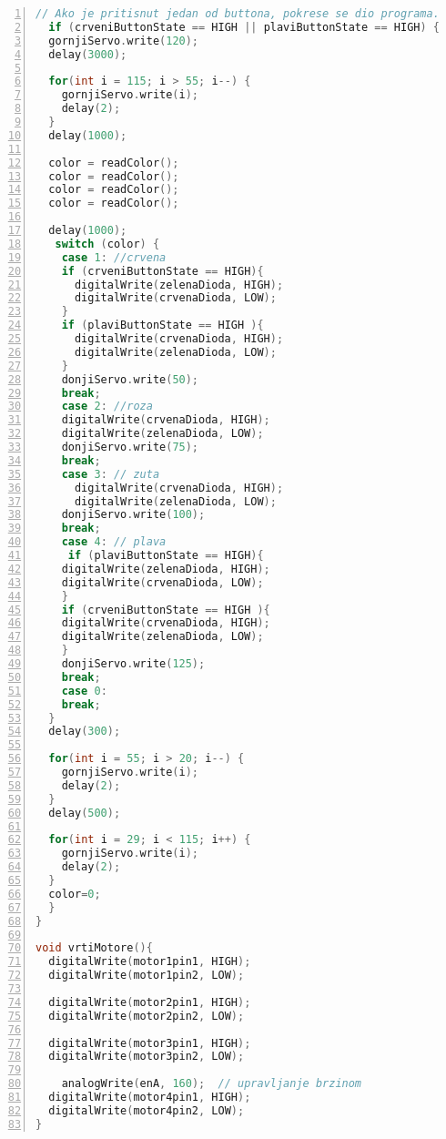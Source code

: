 \begin{lstlisting}[frame=single,language=C++,numbers=left, numberstyle=\tiny, xleftmargin=0.05\textwidth, xrightmargin=0.05\textwidth, basicstyle=\ttfamily\footnotesize]
// Ako je pritisnut jedan od buttona, pokrese se dio programa. Ako korisnik pritisne odgovarajuci button, te pogodi koje je boje loptica, on pobijedi, pali se zelena dioda, u suprotnom, pali se crvena.
  if (crveniButtonState == HIGH || plaviButtonState == HIGH) {
  gornjiServo.write(120);
  delay(3000);
  
  for(int i = 115; i > 55; i--) {
    gornjiServo.write(i);
    delay(2);
  }
  delay(1000);
  
  color = readColor();
  color = readColor();
  color = readColor();
  color = readColor();
  
  delay(1000);  
   switch (color) {
    case 1: //crvena
    if (crveniButtonState == HIGH){
      digitalWrite(zelenaDioda, HIGH);
      digitalWrite(crvenaDioda, LOW);
    }
    if (plaviButtonState == HIGH ){
      digitalWrite(crvenaDioda, HIGH);
      digitalWrite(zelenaDioda, LOW);
    }
    donjiServo.write(50);
    break;
    case 2: //roza
    digitalWrite(crvenaDioda, HIGH);
    digitalWrite(zelenaDioda, LOW);
    donjiServo.write(75);
    break;
    case 3: // zuta
      digitalWrite(crvenaDioda, HIGH);
      digitalWrite(zelenaDioda, LOW);
    donjiServo.write(100);
    break;
    case 4: // plava
     if (plaviButtonState == HIGH){
    digitalWrite(zelenaDioda, HIGH);
    digitalWrite(crvenaDioda, LOW);
    }
    if (crveniButtonState == HIGH ){
    digitalWrite(crvenaDioda, HIGH);
    digitalWrite(zelenaDioda, LOW);
    }
    donjiServo.write(125);
    break;  
    case 0:
    break;
  }
  delay(300);
  
  for(int i = 55; i > 20; i--) {
    gornjiServo.write(i);
    delay(2);
  } 
  delay(500);
  
  for(int i = 29; i < 115; i++) {
    gornjiServo.write(i);
    delay(2);
  }
  color=0;
  }
}

void vrtiMotore(){
  digitalWrite(motor1pin1, HIGH);
  digitalWrite(motor1pin2, LOW);

  digitalWrite(motor2pin1, HIGH);
  digitalWrite(motor2pin2, LOW);

  digitalWrite(motor3pin1, HIGH);
  digitalWrite(motor3pin2, LOW);
  
    analogWrite(enA, 160);  // upravljanje brzinom
  digitalWrite(motor4pin1, HIGH);
  digitalWrite(motor4pin2, LOW);
}
 \end{lstlisting}